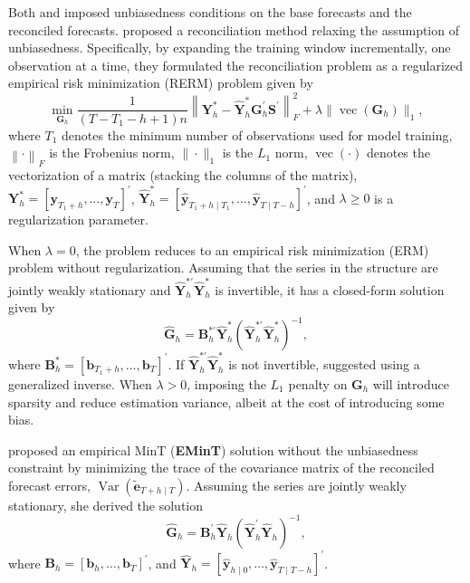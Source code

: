 \documentclass[
  11pt]{article}
\begin{document}
Both \citet{Hyndman2011-sd} and \citet{Wickramasuriya2019-fc} imposed
unbiasedness conditions on the base forecasts and the reconciled
forecasts. \citet{Ben_Taieb2019-be} proposed a reconciliation method
relaxing the assumption of unbiasedness. Specifically, by expanding the
training window incrementally, one observation at a time, they
formulated the reconciliation problem as a regularized empirical risk
minimization (RERM) problem given by \[
\min_{\bm{G}_h} \frac{1}{(T-T_1-h+1)n}\left\|\bm{Y}_{h}^{*}-\hat{\bm{Y}}_{h}^{*} \bm{G}_{h}^{\prime} \bm{S}^{\prime}\right\|_F^2+\lambda\|\operatorname{vec}( \bm{G}_h)\|_1,
\] where \(T_1\) denotes the minimum number of observations used for
model training, \(\left\| \cdot \right\|_F\) is the Frobenius norm,
\(\|\cdot\|_1\) is the \(L_1\) norm, \(\operatorname{vec}(\cdot)\)
denotes the vectorization of a matrix (stacking the columns of the
matrix),
\(\bm{Y}_{h}^{*}=\left[\bm{y}_{T_1+h}, \ldots, \bm{y}_T\right]^{\prime}\),
\(\hat{\bm{Y}}_{h}^{*}=\left[\hat{\bm{y}}_{T_1+h \mid T_1}, \ldots, \hat{\bm{y}}_{T \mid T-h}\right]^{\prime}\),
and \(\lambda \geq 0\) is a regularization parameter.

When \(\lambda = 0\), the problem reduces to an empirical risk
minimization (ERM) problem without regularization. Assuming that the
series in the structure are jointly weakly stationary and
\(\hat{\bm{Y}}_{h}^{*\prime}\hat{\bm{Y}}_{h}^{*}\) is invertible, it has
a closed-form solution given by \[
\hat{\bm{G}}_h = \bm{B}_{h}^{*\prime}\hat{\bm{Y}}_{h}^{*}\left(\hat{\bm{Y}}_{h}^{*\prime}\hat{\bm{Y}}_{h}^{*}\right)^{-1},
\] where
\(\bm{B}_{h}^{*}=\left[\bm{b}_{T_1+h}, \ldots, \bm{b}_T\right]^{\prime}\).
If \(\hat{\bm{Y}}_{h}^{*\prime}\hat{\bm{Y}}_{h}^{*}\) is not invertible,
\citet{Ben_Taieb2019-be} suggested using a generalized inverse. When
\(\lambda > 0\), imposing the \(L_1\) penalty on \(\bm{G}_h\) will
introduce sparsity and reduce estimation variance, albeit at the cost of
introducing some bias.

\citet{Wickramasuriya2021-am} proposed an empirical MinT
(\textbf{EMinT}) solution without the unbiasedness constraint by
minimizing the trace of the covariance matrix of the reconciled forecast
errors, \(\operatorname{Var}(\tilde{\bm{e}}_{T+h \mid T})\). Assuming
the series are jointly weakly stationary, she derived the solution \[
\hat{\bm{G}}_{h} = \bm{B}_{h}^{\prime}\hat{\bm{Y}}_{h}\left(\hat{\bm{Y}}_{h}^{\prime}\hat{\bm{Y}}_{h}\right)^{-1},
\] where
\(\bm{B}_{h}=\left[\bm{b}_{h}, \ldots, \bm{b}_T\right]^{\prime}\), and
\(\hat{\bm{Y}}_{h}=\left[\hat{\bm{y}}_{h \mid 0}, \ldots, \hat{\bm{y}}_{T \mid T-h}\right]^{\prime}\).
\end{document}
